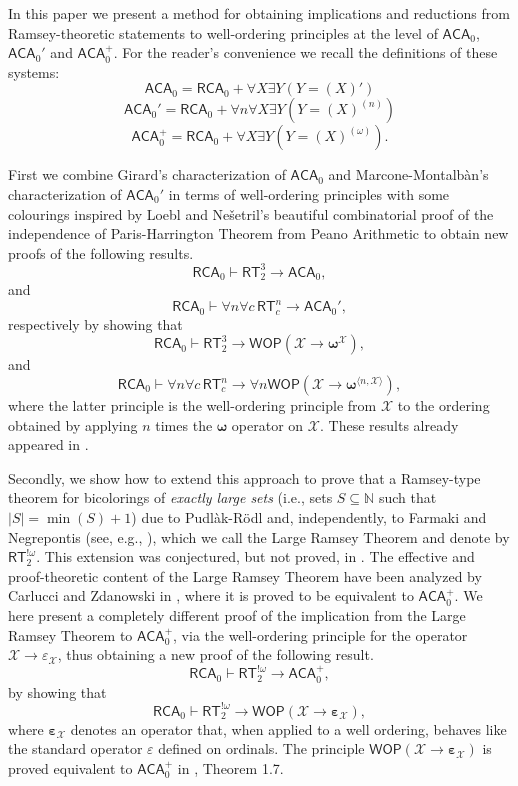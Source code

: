 \documentclass{amsart}
\newcommand\Nat{\mathbb{N}}
\newcommand\RCA{\mathsf{RCA}}
\newcommand\ACA{\mathsf{ACA}}
\newcommand\RT{\mathsf{RT}}
\newcommand\WOP{\mathsf{WOP}}
\newcommand{\LoX}{\mathcal{X}}
\newcommand\boldomega{\pmb{\omega}}
\newcommand\boldepsilon{\pmb{\varepsilon}}
\begin{document}
In this paper we present a method for obtaining implications and reductions from Ramsey-theoretic
statements to well-ordering principles at the level of $\ACA_0$, $\ACA_0'$ and $\ACA_0^+$.
For the reader's convenience we recall the definitions of these systems: 
$$\ACA_0 = \RCA_0 + \forall X \exists Y ( Y = (X)')$$
$$\ACA_0' = \RCA_0 + \forall n\forall X \exists Y ( Y = (X)^{(n)})$$
$$\ACA_0^+ = \RCA_0 + \forall X \exists Y ( Y = (X)^{(\omega)}).$$

First we combine Girard's characterization of $\ACA_0$ and Marcone-Montalb\`an's characterization 
of $\ACA_0'$ in terms of well-ordering principles with some colourings inspired by Loebl and Ne\v{s}etril's  
beautiful combinatorial proof of the independence of Paris-Harrington Theorem from Peano Arithmetic
\cite{Loe-Nes:92} to obtain new proofs of the following results.
$$\RCA_0\vdash \RT^3_2 \to \ACA_0,$$
and
$$\RCA_0\vdash \forall n \forall c \,\RT^n_c \to \ACA_0',$$
respectively by showing that
$$\RCA_0\vdash \RT^3_2 \to \WOP(\LoX \to \boldomega^\LoX),$$
and
$$\RCA_0\vdash \forall n \forall c \,\RT^n_c \to \forall n\WOP(\LoX \to \boldomega^{\langle n, \LoX\rangle}),$$
where the latter principle is the well-ordering principle from $\LoX$ to 
the ordering obtained by applying $n$ times the $\boldomega$ operator on $\LoX$. These results already appeared in \cite{Car:12}.

Secondly, we show how to extend this approach to prove that a Ramsey-type theorem for 
bicolorings of {\em exactly large sets} (i.e., sets $S\subseteq\Nat$ such that $|S|=\min(S)+1$) 
due to Pudl\`ak-R\"odl \cite{Pud-Rod:82} and, independently, to 
Farmaki and Negrepontis (see, e.g., \cite{Far-Neg:08}), which we call the Large Ramsey Theorem and denote by 
$\RT^{!\omega}_2$.
This extension was conjectured, but not proved, in \cite{Car:12}.
The effective and proof-theoretic content of the Large Ramsey Theorem 
have been analyzed by Carlucci and Zdanowski in 
\cite{Car:12}, where it is proved to be equivalent to $\ACA_0^+$. We here 
present a completely different proof of the implication from the Large Ramsey Theorem to $\ACA_0^+$, via the well-ordering principle for the operator $\LoX\to \varepsilon_\LoX$, thus obtaining a new proof of the following result.
$$ \RCA_0 \vdash \RT^{!\omega}_2 \to \ACA_0^+,$$
by showing that 
$$\RCA_0\vdash \RT^{!\omega}_2 \to \WOP(\LoX \to \boldepsilon_\LoX),$$
where $\boldepsilon_\LoX$ denotes 
an operator that, when applied to a well ordering, behaves like the standard operator $\varepsilon$ defined on ordinals. 
The principle $\WOP(\LoX \to \boldepsilon_\LoX)$ is proved equivalent to $\ACA_0^+$ in \cite{Mar-Mon:11}, Theorem 1.7.
\end{document}

